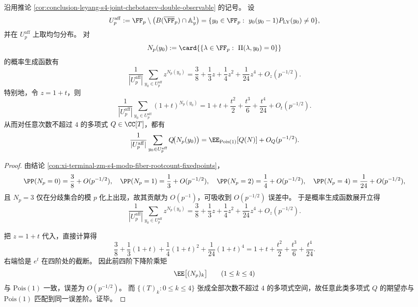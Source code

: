 \begin{theorem}\label{thm:conclusion-leyang-unramified-fiber-count-quartic-poisson-cloak}
沿用推论 \ref{cor:conclusion-leyang-s4-joint-chebotarev-double-observable} 的记号。
设
\[
U_p^{\mathrm{aff}}
:=
\FF_p\setminus \bigl(B(\overline{\FF}_p)\cap \mathbb A^1_y\bigr)
=
\{y_0\in \FF_p:\ y_0(y_0-1)P_{\mathrm{LY}}(y_0)\neq 0\},
\]
并在 \(U_p^{\mathrm{aff}}\) 上取均匀分布。
对
\[
N_p(y_0):=\card{\{\lambda\in \FF_p:\ \Pi(\lambda,y_0)=0\}}
\]
的概率生成函数有
\[
\frac{1}{|U_p^{\mathrm{aff}}|}
\sum_{y_0\in U_p^{\mathrm{aff}}} z^{N_p(y_0)}
=
\frac38+\frac13 z+\frac14 z^2+\frac1{24}z^4+O_z(p^{-1/2}).
\]
特别地，令 \(z=1+t\)，则
\[
\frac{1}{|U_p^{\mathrm{aff}}|}
\sum_{y_0\in U_p^{\mathrm{aff}}} (1+t)^{N_p(y_0)}
=
1+t+\frac{t^2}{2}+\frac{t^3}{6}+\frac{t^4}{24}+O_t(p^{-1/2}).
\]
从而对任意次数不超过 \(4\) 的多项式 \(Q\in \CC[T]\)，都有
\[
\frac{1}{|U_p^{\mathrm{aff}}|}
\sum_{y_0\in U_p^{\mathrm{aff}}} Q\!\bigl(N_p(y_0)\bigr)
=
\EE_{\mathrm{Pois}(1)}[Q(N)]+O_Q(p^{-1/2}).
\]
\end{theorem}
\begin{proof}
由结论 \ref{con:xi-terminal-zm-s4-modp-fiber-rootcount-fixedpoints}，
\[
\PP(N_p=0)=\frac38+O(p^{-1/2}),\quad
\PP(N_p=1)=\frac13+O(p^{-1/2}),\quad
\PP(N_p=2)=\frac14+O(p^{-1/2}),\quad
\PP(N_p=4)=\frac1{24}+O(p^{-1/2}),
\]
且 \(N_p=3\) 仅在分歧集合的模 \(p\) 化上出现，故其贡献为 \(O(p^{-1})\)，可吸收到 \(O(p^{-1/2})\) 误差中。
于是概率生成函数展开立得
\[
\frac{1}{|U_p^{\mathrm{aff}}|}
\sum_{y_0\in U_p^{\mathrm{aff}}} z^{N_p(y_0)}
=
\frac38+\frac13 z+\frac14 z^2+\frac1{24}z^4+O_z(p^{-1/2}).
\]

把 \(z=1+t\) 代入，直接计算得
\[
\frac38+\frac13(1+t)+\frac14(1+t)^2+\frac1{24}(1+t)^4
=
1+t+\frac{t^2}{2}+\frac{t^3}{6}+\frac{t^4}{24}.
\]
右端恰是 \(e^t\) 在四阶处的截断。
因此前四阶下降阶乘矩
\[
\EE\bigl[(N_p)_k\bigr]
\qquad (1\le k\le 4)
\]
与 \(\mathrm{Pois}(1)\) 一致，误差为 \(O(p^{-1/2})\)。
而 \(\{(T)_k:0\le k\le 4\}\) 张成全部次数不超过 \(4\) 的多项式空间，故任意此类多项式 \(Q\) 的期望亦与 \(\mathrm{Pois}(1)\) 匹配到同一误差阶。证毕。
\end{proof}

